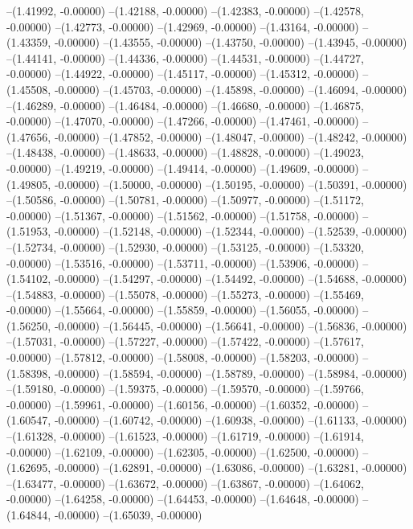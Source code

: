 --(1.41992, -0.00000)
--(1.42188, -0.00000)
--(1.42383, -0.00000)
--(1.42578, -0.00000)
--(1.42773, -0.00000)
--(1.42969, -0.00000)
--(1.43164, -0.00000)
--(1.43359, -0.00000)
--(1.43555, -0.00000)
--(1.43750, -0.00000)
--(1.43945, -0.00000)
--(1.44141, -0.00000)
--(1.44336, -0.00000)
--(1.44531, -0.00000)
--(1.44727, -0.00000)
--(1.44922, -0.00000)
--(1.45117, -0.00000)
--(1.45312, -0.00000)
--(1.45508, -0.00000)
--(1.45703, -0.00000)
--(1.45898, -0.00000)
--(1.46094, -0.00000)
--(1.46289, -0.00000)
--(1.46484, -0.00000)
--(1.46680, -0.00000)
--(1.46875, -0.00000)
--(1.47070, -0.00000)
--(1.47266, -0.00000)
--(1.47461, -0.00000)
--(1.47656, -0.00000)
--(1.47852, -0.00000)
--(1.48047, -0.00000)
--(1.48242, -0.00000)
--(1.48438, -0.00000)
--(1.48633, -0.00000)
--(1.48828, -0.00000)
--(1.49023, -0.00000)
--(1.49219, -0.00000)
--(1.49414, -0.00000)
--(1.49609, -0.00000)
--(1.49805, -0.00000)
--(1.50000, -0.00000)
--(1.50195, -0.00000)
--(1.50391, -0.00000)
--(1.50586, -0.00000)
--(1.50781, -0.00000)
--(1.50977, -0.00000)
--(1.51172, -0.00000)
--(1.51367, -0.00000)
--(1.51562, -0.00000)
--(1.51758, -0.00000)
--(1.51953, -0.00000)
--(1.52148, -0.00000)
--(1.52344, -0.00000)
--(1.52539, -0.00000)
--(1.52734, -0.00000)
--(1.52930, -0.00000)
--(1.53125, -0.00000)
--(1.53320, -0.00000)
--(1.53516, -0.00000)
--(1.53711, -0.00000)
--(1.53906, -0.00000)
--(1.54102, -0.00000)
--(1.54297, -0.00000)
--(1.54492, -0.00000)
--(1.54688, -0.00000)
--(1.54883, -0.00000)
--(1.55078, -0.00000)
--(1.55273, -0.00000)
--(1.55469, -0.00000)
--(1.55664, -0.00000)
--(1.55859, -0.00000)
--(1.56055, -0.00000)
--(1.56250, -0.00000)
--(1.56445, -0.00000)
--(1.56641, -0.00000)
--(1.56836, -0.00000)
--(1.57031, -0.00000)
--(1.57227, -0.00000)
--(1.57422, -0.00000)
--(1.57617, -0.00000)
--(1.57812, -0.00000)
--(1.58008, -0.00000)
--(1.58203, -0.00000)
--(1.58398, -0.00000)
--(1.58594, -0.00000)
--(1.58789, -0.00000)
--(1.58984, -0.00000)
--(1.59180, -0.00000)
--(1.59375, -0.00000)
--(1.59570, -0.00000)
--(1.59766, -0.00000)
--(1.59961, -0.00000)
--(1.60156, -0.00000)
--(1.60352, -0.00000)
--(1.60547, -0.00000)
--(1.60742, -0.00000)
--(1.60938, -0.00000)
--(1.61133, -0.00000)
--(1.61328, -0.00000)
--(1.61523, -0.00000)
--(1.61719, -0.00000)
--(1.61914, -0.00000)
--(1.62109, -0.00000)
--(1.62305, -0.00000)
--(1.62500, -0.00000)
--(1.62695, -0.00000)
--(1.62891, -0.00000)
--(1.63086, -0.00000)
--(1.63281, -0.00000)
--(1.63477, -0.00000)
--(1.63672, -0.00000)
--(1.63867, -0.00000)
--(1.64062, -0.00000)
--(1.64258, -0.00000)
--(1.64453, -0.00000)
--(1.64648, -0.00000)
--(1.64844, -0.00000)
--(1.65039, -0.00000)
